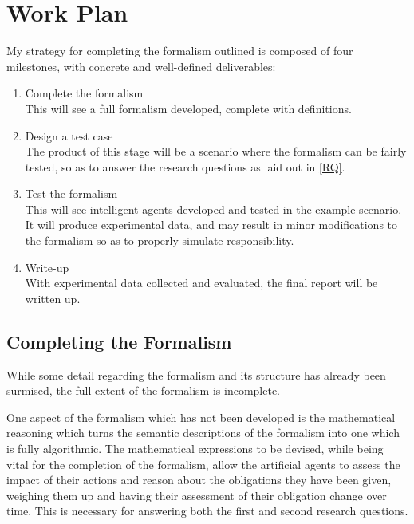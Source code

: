 \section{Work Plan}\label{sec:work_plan}

My strategy for completing the formalism outlined is composed of four milestones, with concrete and well-defined deliverables:
\begin{enumerate}
    \item Complete the formalism\\
    This will see a full formalism developed, complete with definitions.
    \item Design a test case\\
    The product of this stage will be a scenario where the formalism can be fairly tested, so as to answer the research questions as laid out in \cref{RQ}.
    \item Test the formalism\\
    This will see intelligent agents developed and tested in the example scenario. It will produce experimental data, and may result in minor modifications to the formalism so as to properly simulate responsibility.
    \item Write-up\\
    With experimental data collected and evaluated, the final report will be written up.
\end{enumerate}

\subsection{Completing the Formalism}
While some detail regarding the formalism and its structure has already been surmised, the full extent of the formalism is incomplete.\par

One aspect of the formalism which has not been developed is the mathematical reasoning which turns the semantic descriptions of the formalism into one which is fully algorithmic. The mathematical expressions to be devised, while being vital for the completion of the formalism, allow the artificial agents to assess the impact of their actions and reason about the obligations they have been given, weighing them up and having their assessment of their obligation change over time. This is necessary for answering both the first and second research questions.\par

